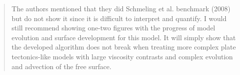 \documentclass[a4paper,12pt]{article}
\begin{document}
\begin{quotation}
The authors mentioned that they did Schmeling et al. benchmark (2008) but do not show it since it is difficult to interpret and quantify. I would still recommend showing one-two figures with the progress of model evolution and surface development for this model. It will simply show that the developed algorithm does not break when treating more complex plate tectonics-like models with large viscosity contrasts and complex evolution and advection of the free surface.
\end{quotation}
\end{document}
